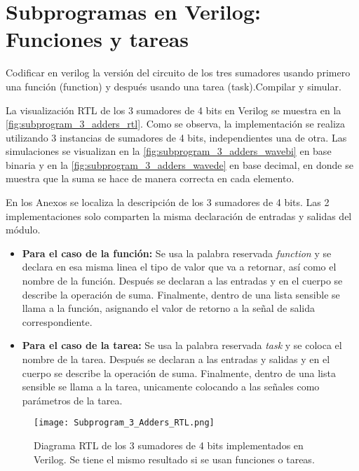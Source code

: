 \section{Subprogramas en Verilog: Funciones y tareas \label{sec:s3}}

\begin{center}
	\begin{minipage}{12cm}
		\begin{tcolorbox}[title=Actividad 1]
			Codificar en verilog la versión del circuito de los tres sumadores usando primero una función (function) y después usando una tarea (task).Compilar y simular.
		\end{tcolorbox}	
	\end{minipage}
\end{center}

La visualización RTL de los 3 sumadores de 4 bits en Verilog se muestra en la \autoref{fig:subprogram_3_adders_rtl}. Como se observa, la implementación se realiza utilizando 3 instancias de sumadores de 4 bits, independientes una de otra. Las simulaciones se visualizan en la \autoref{fig:subprogram_3_adders_wavebi} en base binaria y en la \autoref{fig:subprogram_3_adders_wavede} en base decimal, en donde se muestra que la suma se hace de manera correcta en cada elemento.

En los Anexos se localiza la descripción de los 3 sumadores de 4 bits. Las 2 implementaciones solo comparten la misma declaración de entradas y salidas del módulo.

\begin{itemize}
	\item \textbf{Para el caso de la función:} Se usa la palabra reservada \textit{function} y se declara en esa misma linea el tipo de valor que va a retornar, así como el nombre de la función. Después se declaran a las entradas y en el cuerpo se describe la operación de suma. Finalmente, dentro de una lista sensible se llama a la función, asignando el valor de retorno a la señal de salida correspondiente.
	\item \textbf{Para el caso de la tarea:} Se usa la palabra reservada \textit{task} y se coloca el nombre de la tarea. Después se declaran a las entradas y salidas y en el cuerpo se describe la operación de suma. Finalmente, dentro de una lista sensible se llama a la tarea, unicamente colocando a las señales como parámetros de la tarea.
\end{itemize}

\begin{figure}[ht]
	\centering
	\texttt{[image: Subprogram\_3\_Adders\_RTL.png]}
	\caption{Diagrama RTL de los 3 sumadores de 4 bits implementados en Verilog. Se tiene el mismo resultado si se usan funciones o tareas. \label{fig:subprogram_3_adders_rtl}}
\end{figure}


